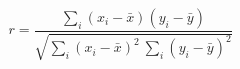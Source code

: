 \documentclass{article}
\begin{document}
 
\[
r = \frac{\displaystyle\sum_i (x_i - \bar{x})(y_i - \bar{y})}{\sqrt{\displaystyle\sum_i (x_i-\bar{x})^2\ \displaystyle\sum_i (y_i - \bar{y})^2}}
\]
 \newpage 
\end{document}
